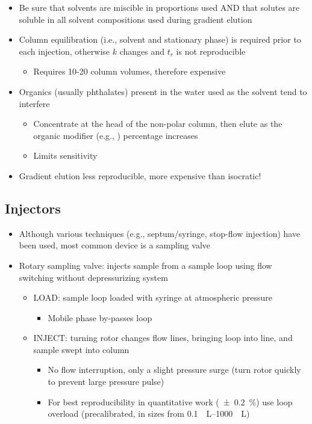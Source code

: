 \documentclass[a4paper, 12pt]{article}
\begin{document}
\begin{itemize}
	\item Be sure that solvents are miscible in proportions used AND that solutes are soluble in all solvent compositions used during gradient elution
	\item Column equilibration (i.e., solvent and stationary phase) is required prior to each injection, otherwise $k$ changes and $t_r$ is not reproducible
	\begin{itemize}
		\item Requires 10-20 column volumes, therefore expensive
	\end{itemize}
		\item Organics (usually phthalates) present in the water used as the solvent tend to interfere
	\begin{itemize}
		\item Concentrate at the head of the non-polar column, then elute as the organic modifier (e.g., ) percentage increases
		\item Limits sensitivity
	\end{itemize}
	\item Gradient elution less reproducible, more expensive than isocratic!
\end{itemize}


\subsection{Injectors}

\begin{itemize}
	\item Although various techniques (e.g., septum/syringe, stop-flow injection) have been used, most common device is a sampling valve
	\item Rotary sampling valve: injects sample from a sample loop using flow switching without depressurizing system
	\begin{itemize}
		\item LOAD: sample loop loaded with syringe at atmospheric pressure
		\begin{itemize}
			\item Mobile phase by-passes loop
		\end{itemize}
		\item INJECT:  turning rotor changes flow lines, bringing loop into line, and sample swept into column
		\begin{itemize}
			\item No flow interruption, only a slight pressure surge (turn rotor quickly to prevent large pressure pulse)
			\item For best reproducibility in quantitative work (\SI{+-0.2}{\%}) use loop overload (precalibrated, in sizes from \SIrange{0.1}{1000}{\mu{}L})
		\end{itemize}
	\end{itemize}
\end{itemize}
\end{document}

